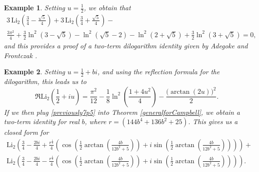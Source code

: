 \documentclass[12pt]{article}
\newtheorem{example}{Example}
\begin{document}
\begin{example}
 Setting $u = \frac{1}{2}$, we obtain that 
\begin{multline*}
 3 \, \mathrm{Li}_2\left(\frac{3}{4} - \frac{\sqrt{5}}{4}\right) 
 + 3 \, \mathrm{Li}_2\left(\frac{3}{4} + \frac{\sqrt{5}}{4}\right) - \\ 
 \frac{3\pi^2}{4} + \frac{3}{2} \ln^2(3 - \sqrt{5}) 
 - \ln^2(\sqrt{5} - 2) - \ln^2(2 + \sqrt{5}) + \frac{3}{2} \ln^2(3 + \sqrt{5})=0, 
\end{multline*}
 and this provides a proof of a two-term dilogarithm identity given by Adegoke and Frontczak \cite{AdegokeFrontczak2024}. 
\end{example}

\begin{example}\label{previously7p6}
 Setting $u = \frac{1}{2} + bi$, and using the reflection formula for the dilogarithm, this leads us to 
\begin{equation}\label{previously7p5}
 \Re \mathrm{Li}_2 \left(\frac{1}{2}+iu \right) = 
 \frac{{\pi}^{2}}{12} - 
 \frac{1}{8} \ln^{2}\left(\frac{1+4u^2}{4} \right) -\frac{({\arctan{(2u)})}^{2}}{2}. 
\end{equation}
 If we then plug \eqref{previously7p5} into Theorem \ref{generalforCampbell}, we obtain a two-term identity for real $b$, where 
 $r=\left(144 b^4 + 136 b^2 + 25\right)$. This gives us a closed form for 
\begin{multline*}
 \mathrm{Li}_2\left(\frac{3}{4} - \frac{2bi}{4} + \frac{r^{\frac{1}{4}}}{4} 
 \left(\cos\left(\frac{1}{2} \arctan\left(\frac{4b}{12b^2 + 5}\right)\right) 
 + i \sin\left(\frac{1}{2} \arctan\left(\frac{4b}{12b^2 + 5}\right)\right)\right)\right) + \\ 
 \mathrm{Li}_2\left(\frac{3}{4} - \frac{2bi}{4} - \frac{r^{\frac{1}{4}}}{4} 
 \left(\cos\left(\frac{1}{2} \arctan\left(\frac{4b}{12b^2 + 5}\right)\right) 
 + i \sin\left(\frac{1}{2} \arctan\left(\frac{4b}{12b^2 + 5}\right)\right)\right)\right). 
\end{multline*}
\end{example}
\end{document}
